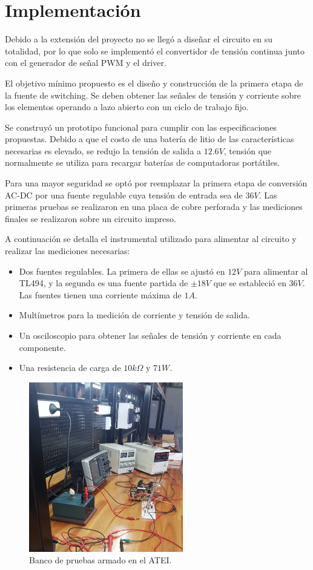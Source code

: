 \section{Implementación}

Debido a la extensión del proyecto no se llegó a diseñar el circuito en su totalidad,
por lo que solo se implementó el convertidor de tensión continua
junto con el generador de señal PWM y el driver.

El objetivo mínimo propuesto es el diseño y construcción de la primera etapa de la fuente de switching. 
Se deben obtener las señales de tensión y corriente sobre los elementos operando a lazo abierto con un ciclo de trabajo fijo. 

Se construyó un prototipo funcional para cumplir con las especificaciones propuestas. 
Debido a que el costo de una batería de litio de las características necesarias es elevado,
se redujo la tensión de salida a $12.6V$, tensión que normalmente se utiliza para recargar baterías de computadoras portátiles.

Para una mayor seguridad se optó por reemplazar la primera etapa de conversión AC-DC por una fuente regulable cuya tensión de entrada sea de $36V$.
Las primeras pruebas se realizaron en una placa de cobre perforada y las mediciones finales se realizaron sobre un circuito impreso. 

A continuación se detalla el instrumental utilizado para alimentar al circuito y realizar las mediciones necesarias:

\begin{itemize}
    \item Dos fuentes regulables. La primera de ellas se ajustó en $12V$ para alimentar al TL494, y la segunda es una fuente partida de $\pm18V$ que se estableció en $36V$. Las fuentes tienen una corriente máxima de $1A$.
    \item Multímetros para la medición de corriente y tensión de salida. 
    \item Un osciloscopio para obtener las señales de tensión y corriente en cada componente.
    \item Una resistencia de carga de $10k\Omega$ y $71W$. 
\end{itemize}

\begin{figure}[H]
    \centering
    \includegraphics[width=0.6\textwidth]{images/setup.jpeg}
    \caption{Banco de pruebas armado en el ATEI.}
    \label{fig:setup}
\end{figure}